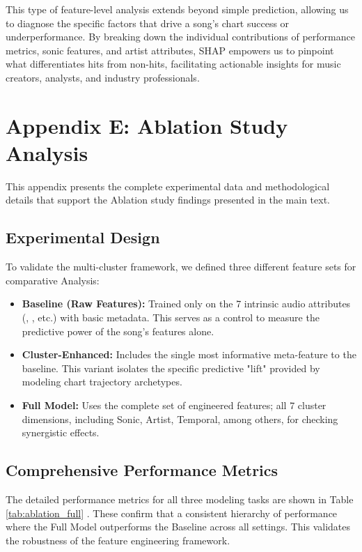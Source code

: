 \documentclass{article}
\begin{document}
This type of feature-level analysis extends beyond simple prediction, allowing us to diagnose the specific factors that drive a song’s chart success or underperformance. By breaking down the individual contributions of performance metrics, sonic features, and artist attributes, SHAP empowers us to pinpoint what differentiates hits from non-hits, facilitating actionable insights for music creators, analysts, and industry professionals.

\section*{Appendix E: Ablation Study Analysis}
\label{app:ablation}

This appendix presents the complete experimental data and methodological details that support the
Ablation study findings presented in the main text.

\subsection*{Experimental Design}
To validate the multi-cluster framework, we defined three different feature sets for comparative Analysis:
\begin{itemize}
    \item \textbf{Baseline (Raw Features):} Trained only on the 7 intrinsic audio attributes
(, , etc.) with basic metadata. This serves as a control to measure the predictive power of the song's features alone.
    \item \textbf{Cluster-Enhanced:} Includes the single most informative meta-feature
 to the baseline. This variant isolates the specific predictive "lift" provided by modeling chart trajectory archetypes.
    \item \textbf{Full Model:} Uses the complete set of engineered features; all 7 cluster dimensions, including Sonic, Artist, Temporal, among others, for checking synergistic effects.
\end{itemize}

\subsection*{Comprehensive Performance Metrics}
The detailed performance metrics for all three modeling tasks are shown in Table \ref{tab:ablation_full} . These confirm that a consistent hierarchy of performance where the Full Model outperforms the Baseline across all settings. This validates the robustness of the feature engineering framework.
\end{document}
